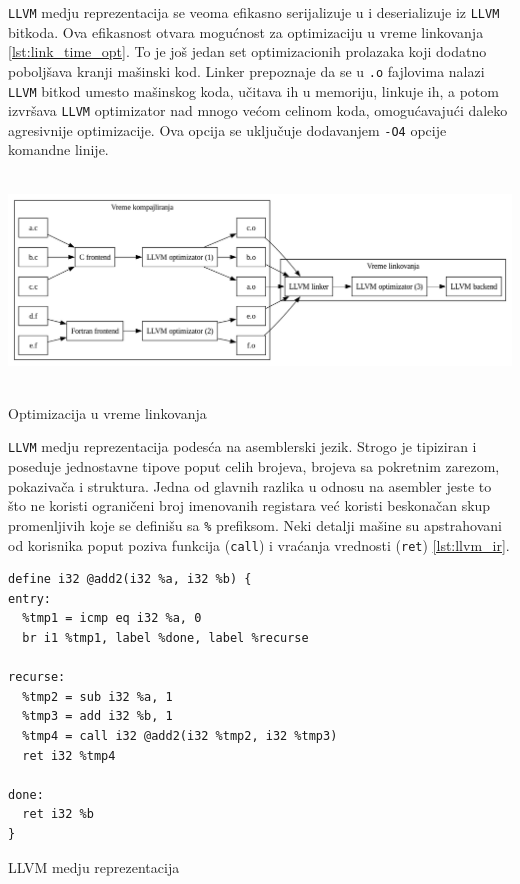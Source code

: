 \documentclass[11pt]{article}
\begin{document}
\verb|LLVM| medju reprezentacija se veoma efikasno serijalizuje u i deserializuje iz \verb|LLVM| bitkoda. 
Ova efikasnost otvara mogućnost za optimizaciju u vreme linkovanja \ref{lst:link_time_opt}. To je još jedan set optimizacionih prolazaka 
koji dodatno poboljšava kranji mašinski kod. Linker prepoznaje da se u \verb|.o| fajlovima nalazi 
\verb|LLVM| bitkod umesto mašinskog koda, učitava ih u memoriju, linkuje ih, a potom izvršava \verb|LLVM|
optimizator nad mnogo većom celinom koda, omogućavajući daleko agresivnije optimizacije. 
Ova opcija se uključuje dodavanjem \verb|-O4| opcije komandne linije. 

\begin{listing}[H]
\begin{center}
\includegraphics[width=6in, height=2.2in]{assets/images/link_time_optimization.png}
\end{center}
\caption{Optimizacija u vreme linkovanja}
\label{lst:link_time_opt}
\end{listing}

\verb|LLVM| medju reprezentacija podesća na asemblerski jezik. Strogo je tipiziran i poseduje jednostavne 
tipove poput celih brojeva, brojeva sa pokretnim zarezom, pokazivača i struktura. Jedna od glavnih razlika 
u odnosu na asembler jeste to što ne koristi ograničeni broj imenovanih registara već koristi beskonačan 
skup promenljivih koje se definišu sa \verb|%| prefiksom. Neki detalji mašine su apstrahovani od korisnika 
poput poziva funkcija (\verb|call|) i vraćanja vrednosti (\verb|ret|) \ref{lst:llvm_ir}.

\begin{listing}[H]
\begin{verbatim}
define i32 @add2(i32 %a, i32 %b) {
entry:
  %tmp1 = icmp eq i32 %a, 0
  br i1 %tmp1, label %done, label %recurse

recurse:
  %tmp2 = sub i32 %a, 1
  %tmp3 = add i32 %b, 1
  %tmp4 = call i32 @add2(i32 %tmp2, i32 %tmp3)
  ret i32 %tmp4

done:
  ret i32 %b
}
\end{verbatim}
\caption{LLVM medju reprezentacija}
\label{lst:llvm_ir}
\end{listing}
\end{document}
